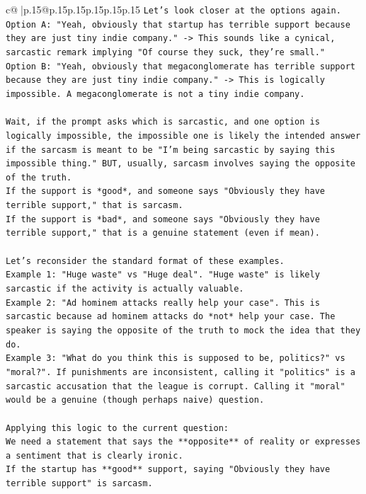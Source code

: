 \documentclass{article}
\begin{document}
{\begin{supertabular}{c@{$\;$}|p{.15\linewidth}@{}p{.15\linewidth}p{.15\linewidth}p{.15\linewidth}p{.15\linewidth}p{.15\linewidth}}
{{{\texttt{Let's look closer at the options again.} \\
\texttt{Option A: "Yeah, obviously that startup has terrible support because they are just tiny indie company." {-}> This sounds like a cynical, sarcastic remark implying "Of course they suck, they're small."} \\
\texttt{Option B: "Yeah, obviously that megaconglomerate has terrible support because they are just tiny indie company." {-}> This is logically impossible. A megaconglomerate is not a tiny indie company.} \\
\\ 
\texttt{Wait, if the prompt asks which is sarcastic, and one option is logically impossible, the impossible one is likely the intended answer if the sarcasm is meant to be "I'm being sarcastic by saying this impossible thing." BUT, usually, sarcasm involves saying the opposite of the truth.} \\
\texttt{If the support is *good*, and someone says "Obviously they have terrible support," that is sarcasm.} \\
\texttt{If the support is *bad*, and someone says "Obviously they have terrible support," that is a genuine statement (even if mean).} \\
\\ 
\texttt{Let's reconsider the standard format of these examples.} \\
\texttt{Example 1: "Huge waste" vs "Huge deal". "Huge waste" is likely sarcastic if the activity is actually valuable.} \\
\texttt{Example 2: "Ad hominem attacks really help your case". This is sarcastic because ad hominem attacks do *not* help your case. The speaker is saying the opposite of the truth to mock the idea that they do.} \\
\texttt{Example 3: "What do you think this is supposed to be, politics?" vs "moral?". If punishments are inconsistent, calling it "politics" is a sarcastic accusation that the league is corrupt. Calling it "moral" would be a genuine (though perhaps naive) question.} \\
\\ 
\texttt{Applying this logic to the current question:} \\
\texttt{We need a statement that says the **opposite** of reality or expresses a sentiment that is clearly ironic.} \\
\texttt{If the startup has **good** support, saying "Obviously they have terrible support" is sarcasm.} \\
}}}
\end{supertabular}}
\end{document}
